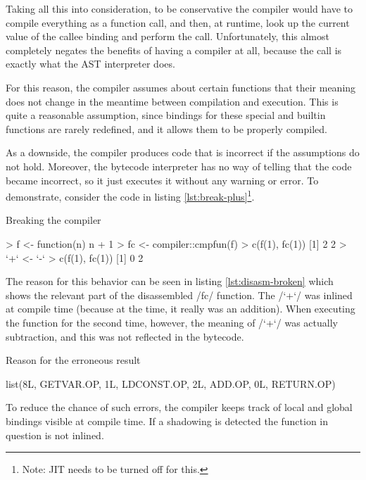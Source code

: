 {Taking all this into consideration, to be conservative the compiler would have to compile everything as a function call, and then, at runtime, look up the current value of the callee binding and perform the call. Unfortunately, this almost completely negates the benefits of having a compiler at all, because the call is exactly what the AST interpreter does.

For this reason, the compiler assumes about certain functions that their meaning does not change in the meantime between compilation and execution. This is quite a reasonable assumption, since bindings for these special and builtin functions are rarely redefined, and it allows them to be properly compiled.

As a downside, the compiler produces code that is incorrect if the assumptions do not hold. Moreover, the bytecode interpreter has no way of telling that the code became incorrect, so it just executes it without any warning or error. To demonstrate, consider the code in listing \ref{lst:break-plus}\footnote{Note: JIT needs to be turned off for this.}.

\begin{listing}[htbp]
  \caption{\label{lst:break-plus}Breaking the compiler}
  \begin{rcode}
> f <- function(n) n + 1
> fc <- compiler::cmpfun(f)
> c(f(1), fc(1))
[1] 2 2
> `+` <- `-`
> c(f(1), fc(1))
[1] 0 2
  \end{rcode}
\end{listing}

The reason for this behavior can be seen in listing \ref{lst:disasm-broken} which shows the relevant part of the disassembled \rinline/fc/ function. The \rinline/`+`/ was inlined at compile time (because at the time, it really was an addition). When executing the function for the second time, however, the meaning of \rinline/`+`/ was actually subtraction, and this was not reflected in the bytecode.

\begin{listing}[htbp]
  \caption{\label{lst:disasm-broken}Reason for the erroneous result}
  \begin{rcode}
list(8L,
     GETVAR.OP, 1L,
     LDCONST.OP, 2L,
     ADD.OP, 0L,
     RETURN.OP)
  \end{rcode}
\end{listing}

To reduce the chance of such errors, the compiler keeps track of local and global bindings visible at compile time. If a shadowing is detected the function in question is not inlined.

}
